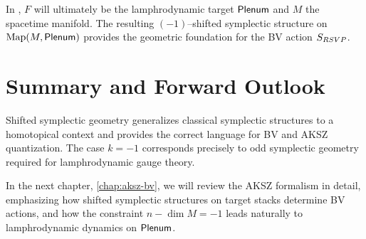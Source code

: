 In \rsvpabbr{}, $F$ will ultimately be the lamphrodynamic target $\mathsf{Plenum}$ and
$M$ the spacetime manifold. The resulting $(-1)$--shifted symplectic structure
on $\operatorname{Map}(M,\mathsf{Plenum})$ provides the geometric foundation for the BV action
$S_{RSVP}$.

\section{Summary and Forward Outlook}

Shifted symplectic geometry generalizes classical symplectic structures to a
homotopical context and provides the correct language for BV and AKSZ
quantization. The case $k=-1$ corresponds precisely to odd symplectic geometry
required for lamphrodynamic gauge theory.

In the next chapter, \cref{chap:aksz-bv}, we will review the AKSZ formalism in
detail, emphasizing how shifted symplectic structures on target stacks
determine BV actions, and how the constraint $n-\dim M=-1$ leads naturally to
lamphrodynamic dynamics on $\mathsf{Plenum}$.

